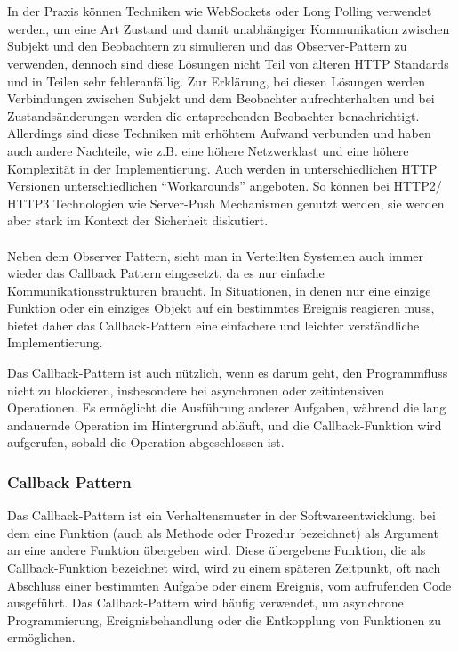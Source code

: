 \\\\
In der Praxis können Techniken wie WebSockets oder Long Polling verwendet werden, um eine Art Zustand und damit unabhängiger Kommunikation zwischen Subjekt und den Beobachtern zu simulieren und das Observer-Pattern zu verwenden, dennoch sind diese Lösungen nicht Teil von älteren HTTP Standards und in Teilen sehr fehleranfällig. Zur Erklärung, bei diesen Lösungen werden Verbindungen zwischen Subjekt und dem Beobachter aufrechterhalten und bei Zustandsänderungen werden die entsprechenden Beobachter benachrichtigt. Allerdings sind diese Techniken mit erhöhtem Aufwand verbunden und haben auch andere Nachteile, wie z.B. eine höhere Netzwerklast und eine höhere Komplexität in der Implementierung. 
Auch werden in unterschiedlichen HTTP Versionen unterschiedlichen \enquote{Workarounds} angeboten. So können bei HTTP2/ HTTP3 Technologien wie Server-Push Mechanismen genutzt werden, sie werden aber stark im Kontext der Sicherheit diskutiert. 
\\\\
Neben dem Observer Pattern, sieht man in Verteilten Systemen auch immer wieder das Callback Pattern eingesetzt, da es nur einfache Kommunikationsstrukturen braucht. In Situationen, in denen nur eine einzige Funktion oder ein einziges Objekt auf ein bestimmtes Ereignis reagieren muss, bietet daher das Callback-Pattern eine einfachere und leichter verständliche Implementierung.

Das Callback-Pattern ist auch nützlich, wenn es darum geht, den Programmfluss nicht zu blockieren, insbesondere bei asynchronen oder zeitintensiven Operationen. Es ermöglicht die Ausführung anderer Aufgaben, während die lang andauernde Operation im Hintergrund abläuft, und die Callback-Funktion wird aufgerufen, sobald die Operation abgeschlossen ist.

\subsubsection{Callback Pattern}
Das Callback-Pattern ist ein Verhaltensmuster in der Softwareentwicklung, bei dem eine Funktion (auch als Methode oder Prozedur bezeichnet) als Argument an eine andere Funktion übergeben wird. Diese übergebene Funktion, die als Callback-Funktion bezeichnet wird, wird zu einem späteren Zeitpunkt, oft nach Abschluss einer bestimmten Aufgabe oder einem Ereignis, vom aufrufenden Code ausgeführt. Das Callback-Pattern wird häufig verwendet, um asynchrone Programmierung, Ereignisbehandlung oder die Entkopplung von Funktionen zu ermöglichen.

